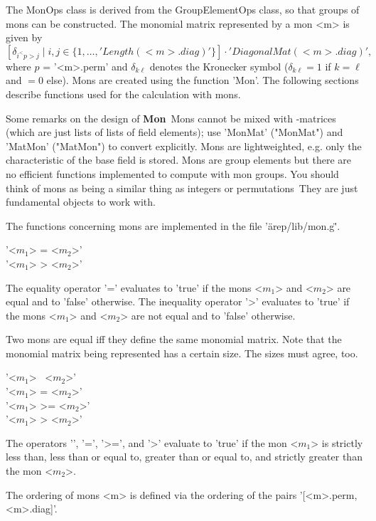 The MonOps class is derived from the GroupElementOps class, 
so that groups of mons can be constructed. The monomial matrix
represented by a mon <m> is given by
$$
[\delta_{i^<p>j}\mid i,j\in\{1,\dots,'Length( <m>.diag )'\}]\cdot 
'DiagonalMat( <m>.diag )',
$$
where $p$ = '<m>.perm' and $\delta_{k\ell}$ denotes the 
Kronecker symbol ($\delta_{k\ell} = 1$ if $k = \ell$ and $= 0$ else). 
Mons are 
created using the function 'Mon'. The following sections describe 
functions used for the calculation with mons.

Some remarks on the design of {\bf Mon}\:\ Mons cannot be mixed 
with {\GAP}-matrices (which are just lists of lists of field
elements); use 'MonMat' ("MonMat") and 'MatMon' ("MatMon") to convert
explicitly. Mons are lightweighted, e.g. only the characteristic of
the base field is stored.  Mons are group elements but there are no
efficient functions implemented to compute with mon groups. You should
think of mons as being a similar thing as integers or permutations\:\
They are just fundamental objects to work with.

The functions concerning mons are implemented in the file 
'\"arep/lib/mon.g\"'.

\Section{Comparison of Mons}%
%

'<$m_1$> = <$m_2$>' \\
'<$m_1$> \<> <$m_2$>'

The equality operator '=' evaluates to 'true'  if the mons <$m_1$>
and <$m_2$> are  equal and  to 'false' otherwise. The  inequality operator
'\<>' evaluates to 'true' if the mons <$m_1$> and <$m_2$> are not equal
and to 'false' otherwise.

Two mons are equal iff they define the same monomial matrix. Note
that the monomial matrix being represented has a certain size. The
sizes must agree, too.

\bigskip
'<$m_1$> \<\ <$m_2$>' \\
'<$m_1$> \<= <$m_2$>' \\
'<$m_1$> >= <$m_2$>' \\
'<$m_1$> > <$m_2$>'

The operators '\<', '\<=', '>=', and '>' evaluate to 'true' if the 
mon <$m_1$> is strictly less than, less than or equal to, greater than or
equal to, and strictly greater than the mon <$m_2$>. 

The ordering of mons <m> is defined via the ordering 
of the pairs '[<m>.perm, <m>.diag]'.

